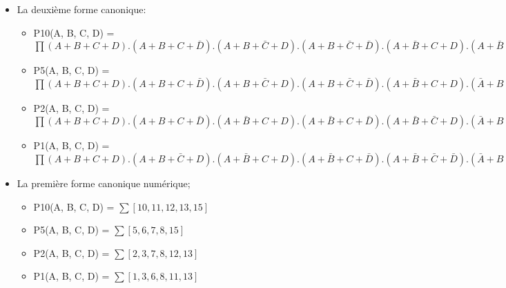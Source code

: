 \begin{enumerate}
\begin{itemize}
\begin{itemize}
\item P1(A, B, C, D) = $\sum \bar A.\bar B.\bar C.D + \bar A.\bar B.C.D + \bar A.B.C.\bar D + A.\bar B.\bar C.\bar D + A.\bar B.C.D + A.B.\bar C.D$ 


\end{itemize}
\item La deuxième forme canonique:  



\begin{itemize}
\item P10(A, B, C, D) = $\prod (A+B+C+D) . (A+B+C+\bar D) . (A+B+\bar C+D) . (A+B+\bar C+\bar D) . (A+\bar B+C+D) . (A+\bar B+C+\bar D) . (A+\bar B+\bar C+D) . (A+\bar B+\bar C+\bar D) . (\bar A+B+C+D) . (\bar A+B+C+\bar D) . (\bar A+\bar B+\bar C+D)$ 


\item P5(A, B, C, D) = $\prod (A+B+C+D) . (A+B+C+\bar D) . (A+B+\bar C+D) . (A+B+\bar C+\bar D) . (A+\bar B+C+D) . (\bar A+B+C+\bar D) . (\bar A+B+\bar C+D) . (\bar A+B+\bar C+\bar D) . (\bar A+\bar B+C+D) . (\bar A+\bar B+C+\bar D) . (\bar A+\bar B+\bar C+D)$ 


\item P2(A, B, C, D) = $\prod (A+B+C+D) . (A+B+C+\bar D) . (A+\bar B+C+D) . (A+\bar B+C+\bar D) . (A+\bar B+\bar C+D) . (\bar A+B+C+\bar D) . (\bar A+B+\bar C+D) . (\bar A+B+\bar C+\bar D) . (\bar A+\bar B+\bar C+D) . (\bar A+\bar B+\bar C+\bar D)$ 


\item P1(A, B, C, D) = $\prod (A+B+C+D) . (A+B+\bar C+D) . (A+\bar B+C+D) . (A+\bar B+C+\bar D) . (A+\bar B+\bar C+\bar D) . (\bar A+B+C+\bar D) . (\bar A+B+\bar C+D) . (\bar A+\bar B+C+D) . (\bar A+\bar B+\bar C+D) . (\bar A+\bar B+\bar C+\bar D)$ 


\end{itemize}
\item La première forme canonique numérique;  



\begin{itemize}
\item P10(A, B, C, D) = $\sum [10, 11, 12, 13, 15]$ 


\item P5(A, B, C, D) = $\sum [5, 6, 7, 8, 15]$ 


\item P2(A, B, C, D) = $\sum [2, 3, 7, 8, 12, 13]$ 


\item P1(A, B, C, D) = $\sum [1, 3, 6, 8, 11, 13]$ 



\end{itemize}
\end{itemize}
\end{enumerate}

